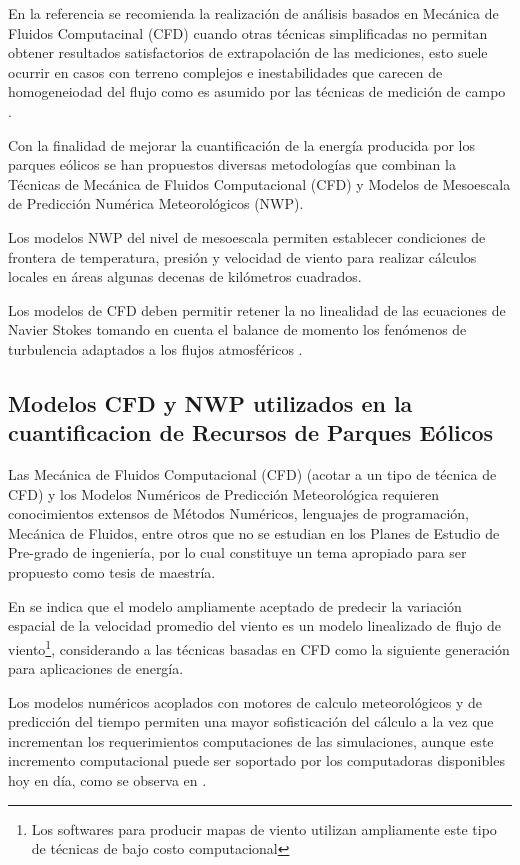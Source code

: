 En la referencia \citep{wbank_guidelines_2014} se recomienda la realización de análisis basados en Mecánica de Fluidos Computacinal  (CFD) cuando otras técnicas simplificadas no permitan obtener resultados satisfactorios de extrapolación de las mediciones, esto suele ocurrir en casos con terreno complejos e inestabilidades que carecen de homogeneiodad del flujo como es asumido por las técnicas de medición de campo \citep{sanz_state---art_2010}.

Con la finalidad de mejorar la cuantificación de la energía producida por los parques eólicos se han propuestos diversas metodologías que combinan la Técnicas de Mecánica de Fluidos Computacional (CFD) y Modelos de Mesoescala de Predicción Numérica  Meteorológicos (NWP). 

Los modelos NWP del nivel de mesoescala permiten establecer condiciones de frontera de temperatura, presión y velocidad de viento para realizar cálculos locales en áreas algunas decenas de kilómetros cuadrados. 

Los modelos de CFD deben permitir retener la no linealidad de las ecuaciones de Navier Stokes tomando en cuenta el balance de momento los fenómenos de turbulencia adaptados a los flujos atmosféricos \citep{sanz_state---art_2010}. 


\subsection{Modelos CFD y NWP utilizados en la cuantificacion de Recursos de Parques Eólicos}

Las Mecánica  de Fluidos Computacional (CFD) (acotar a un tipo de técnica de CFD) y los Modelos Numéricos de Predicción Meteorológica requieren conocimientos extensos de Métodos Numéricos, lenguajes de programación, Mecánica de Fluidos, entre otros que no se estudian en los Planes de Estudio de Pre-grado de ingeniería, por lo cual constituye un tema apropiado para ser propuesto como tesis de maestría.

En \citep{beaucage_more_????} se indica que el modelo ampliamente aceptado de predecir la variación espacial de la velocidad promedio del viento es un modelo linealizado de flujo de viento\footnote{Los softwares para producir mapas de viento utilizan ampliamente este tipo de técnicas de bajo costo computacional}, considerando a las técnicas basadas en CFD como la siguiente generación para aplicaciones de energía. 

Los modelos numéricos acoplados con motores de calculo meteorológicos y de predicción del tiempo permiten una mayor sofisticación del cálculo a la vez que incrementan los requerimientos computaciones de las simulaciones, aunque este incremento computacional puede ser soportado por los computadoras disponibles hoy en día, como se observa en \citep*{zajaczkowski_preliminary_2011}. 

